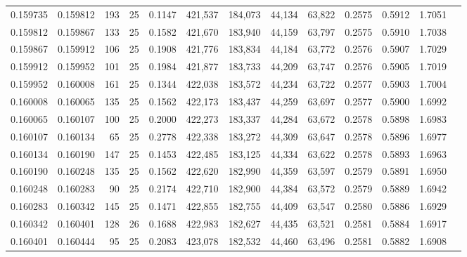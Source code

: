 \begin{tabular}{rrrrrrrrrrrrr}
0.159735 & 0.159812 &   193 &  25 &                                     0.1147 & 421,537 & 184,073 &  44,134 &  63,822 & 0.2575 & 0.5912 & 1.7051 \\
0.159812 & 0.159867 &   133 &  25 &                                     0.1582 & 421,670 & 183,940 &  44,159 &  63,797 & 0.2575 & 0.5910 & 1.7038 \\
0.159867 & 0.159912 &   106 &  25 &                                     0.1908 & 421,776 & 183,834 &  44,184 &  63,772 & 0.2576 & 0.5907 & 1.7029 \\
0.159912 & 0.159952 &   101 &  25 &                                     0.1984 & 421,877 & 183,733 &  44,209 &  63,747 & 0.2576 & 0.5905 & 1.7019 \\
0.159952 & 0.160008 &   161 &  25 &                                     0.1344 & 422,038 & 183,572 &  44,234 &  63,722 & 0.2577 & 0.5903 & 1.7004 \\
0.160008 & 0.160065 &   135 &  25 &                                     0.1562 & 422,173 & 183,437 &  44,259 &  63,697 & 0.2577 & 0.5900 & 1.6992 \\
0.160065 & 0.160107 &   100 &  25 &                                     0.2000 & 422,273 & 183,337 &  44,284 &  63,672 & 0.2578 & 0.5898 & 1.6983 \\
0.160107 & 0.160134 &    65 &  25 &                                     0.2778 & 422,338 & 183,272 &  44,309 &  63,647 & 0.2578 & 0.5896 & 1.6977 \\
0.160134 & 0.160190 &   147 &  25 &                                     0.1453 & 422,485 & 183,125 &  44,334 &  63,622 & 0.2578 & 0.5893 & 1.6963 \\
0.160190 & 0.160248 &   135 &  25 &                                     0.1562 & 422,620 & 182,990 &  44,359 &  63,597 & 0.2579 & 0.5891 & 1.6950 \\
0.160248 & 0.160283 &    90 &  25 &                                     0.2174 & 422,710 & 182,900 &  44,384 &  63,572 & 0.2579 & 0.5889 & 1.6942 \\
0.160283 & 0.160342 &   145 &  25 &                                     0.1471 & 422,855 & 182,755 &  44,409 &  63,547 & 0.2580 & 0.5886 & 1.6929 \\
0.160342 & 0.160401 &   128 &  26 &                                     0.1688 & 422,983 & 182,627 &  44,435 &  63,521 & 0.2581 & 0.5884 & 1.6917 \\
0.160401 & 0.160444 &    95 &  25 &                                     0.2083 & 423,078 & 182,532 &  44,460 &  63,496 & 0.2581 & 0.5882 & 1.6908 \\

\end{tabular}
